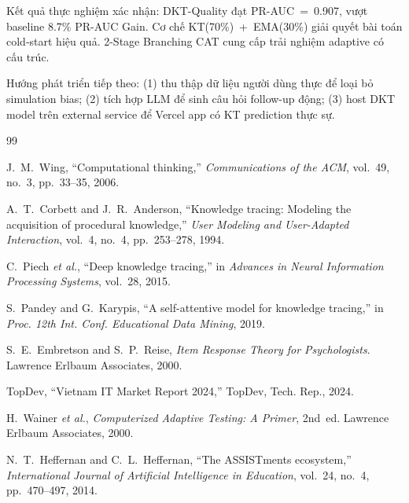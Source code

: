 \documentclass[conference]{IEEEtran}
\begin{document}
Kết quả thực nghiệm xác nhận: DKT-Quality đạt PR-AUC~=~0.907, vượt baseline 8.7\% PR-AUC Gain. Cơ chế KT(70\%)~+~EMA(30\%) giải quyết bài toán cold-start hiệu quả. 2-Stage Branching CAT cung cấp trải nghiệm adaptive có cấu trúc.

Hướng phát triển tiếp theo: (1) thu thập dữ liệu người dùng thực để loại bỏ simulation bias; (2) tích hợp LLM để sinh câu hỏi follow-up động; (3) host DKT model trên external service để Vercel app có KT prediction thực sự.



\begin{thebibliography}{99}

J.~M.~Wing, ``Computational thinking,'' \textit{Communications of the ACM}, vol.~49, no.~3, pp.~33--35, 2006.

A.~T.~Corbett and J.~R.~Anderson, ``Knowledge tracing: Modeling the acquisition of procedural knowledge,'' \textit{User Modeling and User-Adapted Interaction}, vol.~4, no.~4, pp.~253--278, 1994.

C.~Piech \textit{et al.}, ``Deep knowledge tracing,'' in \textit{Advances in Neural Information Processing Systems}, vol.~28, 2015.

S.~Pandey and G.~Karypis, ``A self-attentive model for knowledge tracing,'' in \textit{Proc. 12th Int. Conf. Educational Data Mining}, 2019.

S.~E.~Embretson and S.~P.~Reise, \textit{Item Response Theory for Psychologists}. Lawrence Erlbaum Associates, 2000.

TopDev, ``Vietnam IT Market Report 2024,'' TopDev, Tech. Rep., 2024.

H.~Wainer \textit{et al.}, \textit{Computerized Adaptive Testing: A Primer}, 2nd~ed. Lawrence Erlbaum Associates, 2000.

N.~T.~Heffernan and C.~L.~Heffernan, ``The ASSISTments ecosystem,'' \textit{International Journal of Artificial Intelligence in Education}, vol.~24, no.~4, pp.~470--497, 2014.

\end{thebibliography}
\end{document}
